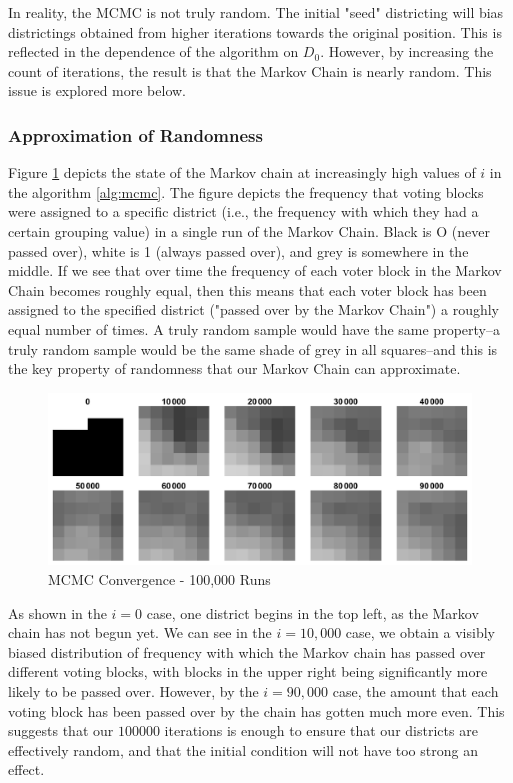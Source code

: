 \documentclass[12pt]{article}
\begin{document}
In reality, the MCMC is not truly random. The initial "seed" districting will bias districtings obtained from higher iterations towards the original position. This is reflected in the dependence of the algorithm on $D_0$. However, by increasing the count of iterations, the result is that the Markov Chain is nearly random. This issue is explored more below.

\subsubsection{Approximation of Randomness}
    Figure \ref{fig:convergence} depicts the state of the Markov chain at increasingly high values of \(i\) in the algorithm \ref{alg:mcmc}. The figure depicts the frequency that voting blocks were assigned to a specific district (i.e., the frequency with which they had a certain grouping value) in a single run of the Markov Chain. Black is O (never passed over), white is 1 (always passed over), and grey is somewhere in the middle. If we see that over time the frequency of each voter block in the Markov Chain becomes roughly equal, then this means that each voter block has been assigned to the specified district ("passed over by the Markov Chain") a roughly equal number of times. A truly random sample would have the same property--a truly random sample would be the same shade of grey in all squares--and this is the key property of randomness that our Markov Chain can approximate.
    
    \begin{figure}[h!]
    \centering
    \includegraphics[scale=0.9]{convergence}
    \caption{MCMC Convergence - 100,000 Runs}
    \label{fig:convergence}
    \end{figure}    
    
    \par
    As shown in the $i=0$ case, one district begins in the top left, as the Markov chain has not begun yet. We can see in the $i=10,000$ case, we obtain a visibly biased distribution of frequency with which the Markov chain has passed over different voting blocks, with blocks in the upper right being significantly more likely to be passed over. However, by the $i=90,000$ case, the amount that each voting block has been passed over by the chain has gotten much more even. This suggests that our $100000$ iterations is enough to ensure that our districts are effectively random, and that the initial condition will not have too strong an effect.
\end{document}
